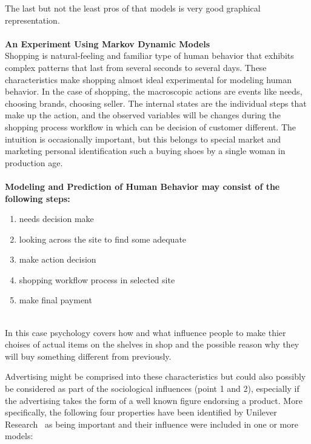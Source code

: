 The last but not the least pros of that models is very good graphical representation.\\
\\
\textbf{An Experiment Using Markov Dynamic Models} \label{subsec:markov_dynamic}\\
Shopping is natural-feeling and familiar type of human behavior that exhibits complex patterns that last from several seconds to several days.
These characteristics make shopping almost ideal experimental for modeling human behavior.
In the case of shopping, the macroscopic actions are events like needs, choosing brands, choosing seller.
The internal states are the individual steps that make up the action, and the observed variables will be changes during the shopping
process workflow in which can be decision of customer different.
The intuition is occasionally important, but this belongs to special market and marketing personal identification such a buying shoes by a single woman in production age.\\
\\
\textbf{Modeling and Prediction of Human Behavior may consist of the following steps:}\\
\begin{enumerate}
	\item needs decision make
	\item looking across the site to find some adequate
	\item make action decision
	\item shopping workflow process in selected site
	\item make final payment
\end{enumerate}
\\
In this case psychology covers how and what influence people to make thier choises of actual items on the shelves in
shop and the possible reason why they will buy something different from previously.

Advertising might be comprised into these characteristics but could also possibly be considered as part of the sociological
influences (point 1 and 2), especially if the advertising takes the form of a well known figure endorsing a product.
More specifically, the following four properties have been identified by Unilever Research~\cite{patel} as being important and their influence were included in one or more models:

